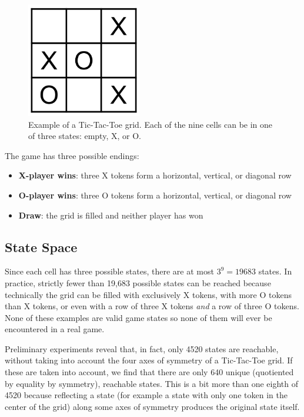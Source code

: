 \documentclass[11pt,a4paper]{report}
\begin{document}
\begin{figure}[htbp]
	\begin{center}
		\includegraphics[width=50mm]{tictactoe_grid_example.png}
		\caption{Example of a Tic-Tac-Toe grid. Each of the nine cells can be in one of three states: empty, X, or O.}
		\label{tic-tac-toe-grid-example}
	\end{center}
\end{figure}

The game has three possible endings:

\begin{itemize}
	\item \textbf{X-player wins}: three X tokens form a horizontal, vertical, or diagonal row
	\item \textbf{O-player wins}: three O tokens form a horizontal, vertical, or diagonal row
	\item \textbf{Draw}: the grid is filled and neither player has won
\end{itemize}


\subsection{State Space}
\label{sec:TicTacToeStateSpace}

Since each cell has three possible states, there are at most $3^9 = 19683$ states. In practice, strictly fewer than 19,683 possible states can be reached because technically the grid can be filled with exclusively X tokens, with more O tokens than X tokens, or even with a row of three X tokens \emph{and} a row of three O tokens. None of these examples are valid game states so none of them will ever be encountered in a real game.

Preliminary experiments reveal that, in fact, only 4520 states are reachable, without taking into account the four axes of symmetry of a Tic-Tac-Toe grid. If these are taken into account, we find that there are only 640 unique (quotiented by equality by symmetry), reachable states. This is a bit more than one eighth of 4520 because reflecting a state (for example a state with only one token in the center of the grid) along some axes of symmetry produces the original state itself.
\end{document}
